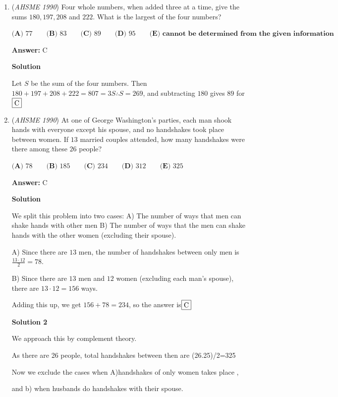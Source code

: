 \begin{enumerate}
	\item (\textit{AHSME 1990}) Four whole numbers, when added three at a time, give the sums $180,197,208$ and $222$. What is the largest of the four numbers?


 $\textbf{(A) } 77\qquad \textbf{(B) } 83\qquad \textbf{(C) } 89\qquad \textbf{(D) } 95\qquad \textbf{(E) cannot be determined from the given information}$

 \textbf{Answer: }C



\textbf{Solution}

Let $S$ be the sum of the four numbers. Then $180+197+208+222=807=3S\therefore S=269$, and subtracting $180$ gives $89$ for $\fbox{C}$



	\item (\textit{AHSME 1990}) At one of George Washington's parties, each man shook hands with everyone except his spouse, and no handshakes took place between women. If $13$ married couples attended, how many handshakes were there among these $26$ people?


 $\textbf{(A) } 78\qquad \textbf{(B) } 185\qquad \textbf{(C) } 234\qquad \textbf{(D) } 312\qquad \textbf{(E) } 325$

 \textbf{Answer: }C



\textbf{Solution}

We split this problem into two cases: A) The number of ways that men can shake hands with other men B) The number of ways that the men can shake hands with the other women (excluding their spouse).

 A) Since there are $13$ men, the number of handshakes between only men is $\frac{13 \cdot 12}{2}=78$.

 B) Since there are $13$ men and $12$ women (excluding each man's spouse), there are $13 \cdot 12 = 156$ ways.

 Adding this up, we get $156+78=234$, so the answer is$\fbox{C}$




\textbf{Solution 2}

We approach this by complement theory.

 
As there are 26 people, total handshakes between then are (26.25)/2=325

 


 Now we exclude the cases when A)handshakes of only women takes place ,

 and b) when husbands do handshakes with their spouse.


\end{enumerate}
